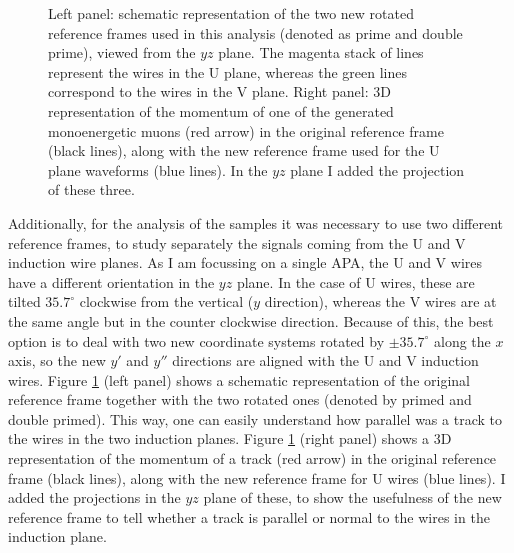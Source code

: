 \begin{figure}[t]
\begin{subfigure}{0.5\textwidth}
	\end{subfigure}
	\caption[Schematic representation of the two rotated reference frames used in the analysis of the MC filter performance.]{Left panel: schematic representation of the two new rotated reference frames used in this analysis (denoted as prime and double prime), viewed from the $yz$ plane. The magenta stack of lines represent the wires in the U plane, whereas the green lines correspond to the wires in the V plane. Right panel: 3D representation of the momentum of one of the generated monoenergetic muons (red arrow) in the original reference frame (black lines), along with the new reference frame used for the U plane waveforms (blue lines). In the $yz$ plane I added the projection of these three.}
	\label{fig:reference_frame}
\end{figure}

Additionally, for the analysis of the samples it was necessary to use two different reference frames, to study separately the signals coming from the U and V induction wire planes. As I am focussing on a single APA, the U and V wires have a different orientation in the $yz$ plane. In the case of U wires, these are tilted $35.7^{\circ}$ clockwise from the vertical ($y$ direction), whereas the V wires are at the same angle but in the counter clockwise direction. Because of this, the best option is to deal with two new coordinate systems rotated by $\pm 35.7^{\circ}$ along the $x$ axis, so the new $y'$ and $y''$ directions are aligned with the U and V induction wires. Figure \ref{fig:reference_frame} (left panel) shows a schematic representation of the original reference frame together with the two rotated ones (denoted by primed and double primed). This way, one can easily understand how parallel was a track to the wires in the two induction planes. Figure \ref{fig:reference_frame} (right panel) shows a 3D representation of the momentum of a track (red arrow) in the original reference frame (black lines), along with the new reference frame for U wires (blue lines). I added the projections in the $yz$ plane of these, to show the usefulness of the new reference frame to tell whether a track is parallel or normal to the wires in the induction plane.

